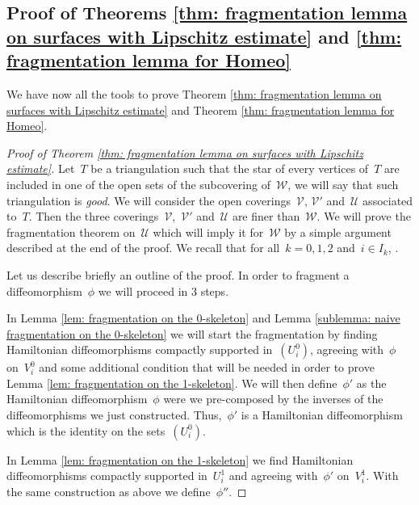 \documentclass[10pt]{amsart}
\begin{document}

\subsection{Proof of Theorems \ref{thm: fragmentation lemma on surfaces with Lipschitz estimate} and \ref{thm: fragmentation lemma for Homeo}}\label{subsec: pf of the thm}

We have now all the tools to prove Theorem \ref{thm: fragmentation lemma on surfaces with Lipschitz estimate} and Theorem \ref{thm: fragmentation lemma for Homeo}.

\begin{proof}[Proof of Theorem \ref{thm: fragmentation lemma on surfaces with Lipschitz estimate}]

Let~$T$ be a triangulation such that the star of every vertices of~$T$ are included in one of the open sets of the subcovering of~$\mathcal{W}$, we will say that such triangulation is \textit{good}. We will consider the open coverings~$\mathcal{V},\, \mathcal{V}'$ and~$\mathcal{U}$ associated to~$T$. Then the three coverings~$\mathcal{V}$,~$\mathcal{V}'$ and~$\mathcal{U}$ are finer than~$\mathcal{W}$. We will prove the fragmentation theorem on~$\mathcal{U}$ which will imply it for~$\mathcal{W}$ by a simple argument described at the end of the proof. We recall that for all~$k=0,1,2$ and~$i\in I_k$, .

Let us describe briefly an outline of the proof. In order to fragment a diffeomorphism~$\phi$ we will proceed in 3 steps.

In Lemma \ref{lem: fragmentation on the 0-skeleton} and Lemma \ref{sublemma: naive fragmentation on the 0-skeleton} we will start the fragmentation by finding Hamiltonian diffeomorphisms compactly supported in~$(U_i^{0})$, agreeing with~$\phi$ on~$V_i^0$ and some additional condition that will be needed in order to prove Lemma \ref{lem: fragmentation on the 1-skeleton}. We will then define~$\phi'$ as the Hamiltonian diffeomorphism~$\phi$ were we pre-composed by the inverses of the diffeomorphisms we just constructed. Thus,~$\phi'$ is a Hamiltonian diffeomorphism which is the identity on the sets~$(U_i^{0})$. 

In Lemma \ref{lem: fragmentation on the 1-skeleton} we find Hamiltonian diffeomorphisms compactly supported in~$U_i^1$ and agreeing with~$\phi'$ on~$V_i^1$. With the same construction as above we define~$\phi''$.


\end{proof}
\end{document}
